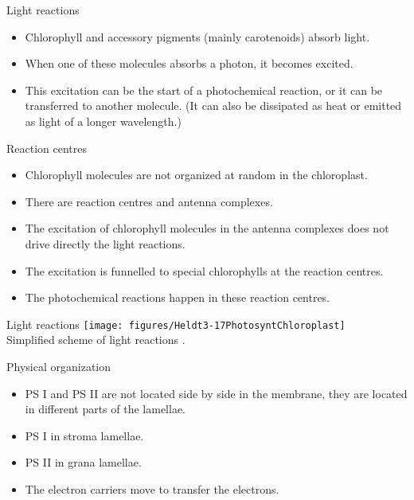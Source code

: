 \documentclass[10pt]{beamer}
\begin{document}
\begin{frame}{Light reactions}
    \begin{itemize}
        \item Chlorophyll and accessory pigments (mainly
        carotenoids) absorb light.
        \item When one of these molecules absorbs a photon, it
        becomes excited.
        \item This excitation can be the start of a
        photochemical reaction, or it can be transferred to another
        molecule. (It can also be dissipated as heat or emitted as
        light of a longer wavelength.)
    \end{itemize}
\end{frame}

\begin{frame}{Reaction centres}
    \begin{itemize}
        \item Chlorophyll molecules are not organized at random in
        the chloroplast.
        \item There are reaction centres and antenna complexes.
        \item The excitation of chlorophyll molecules in the
        antenna complexes does not drive directly the light
        reactions.
        \item The excitation is funnelled to special chlorophylls at
        the reaction centres.
        \item The photochemical reactions happen in these reaction
        centres.
    \end{itemize}
\end{frame}

\begin{frame}{Light reactions}
    \centering
    \texttt{[image: figures/Heldt3-17PhotosyntChloroplast]}\\
    {\small Simplified scheme of light reactions \autocite[from][]{Heldt1997}.}
\end{frame}

\begin{frame}{Physical organization}
    \begin{itemize}
        \item PS I and PS II are not located side by side in the
        membrane, they are located in different parts of the
        lamellae.
        \item PS I in stroma lamellae.
        \item PS II in grana lamellae.
        \item The electron carriers move to transfer the electrons.
    \end{itemize}
\end{frame}
\end{document}

